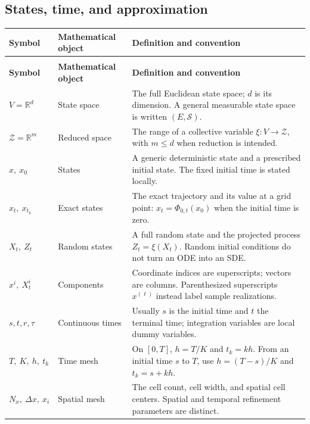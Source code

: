 \subsection*{States, time, and approximation}
\begingroup
\small
{}
\setlength{\tabcolsep}{4pt}
\renewcommand{\arraystretch}{1.16}
\begin{longtable}{@{}>{\raggedright\arraybackslash}p{32mm}>{\raggedright\arraybackslash}p{26mm}>{\raggedright\arraybackslash}p{90mm}@{}}
\toprule
\textbf{Symbol} & \textbf{Mathematical object} & \textbf{Definition and convention}\\
\midrule
\endfirsthead
\multicolumn{3}{@{}l}{\small\itshape States, time, and approximation (continued)}\\[3pt]
\toprule
\textbf{Symbol} & \textbf{Mathematical object} & \textbf{Definition and convention}\\
\midrule
\endhead
\bottomrule
\endfoot
$V=\mathbb R^d$ & State space & The full Euclidean state space; $d$ is its dimension. A general measurable state space is written $(E,\mathcal S)$.\\[3pt]
$\mathcal Z=\mathbb R^m$ & Reduced space & The range of a collective variable $\xi:V\to\mathcal Z$, with $m\le d$ when reduction is intended.\\[3pt]
$x,\ x_0$ & States & A generic deterministic state and a prescribed initial state. The fixed initial time is stated locally.\\[3pt]
$x_t,\ x_{t_k}$ & Exact states & The exact trajectory and its value at a grid point: $x_t=\Phi_{0,t}(x_0)$ when the initial time is zero.\\[3pt]
$X_t,\ Z_t$ & Random states & A full random state and the projected process $Z_t=\xi(X_t)$. Random initial conditions do not turn an ODE into an SDE.\\[3pt]
$x^i,\ X_t^i$ & Components & Coordinate indices are superscripts; vectors are columns. Parenthesized superscripts $x^{(\ell)}$ instead label sample realizations.\\[3pt]
$s,t,r,\tau$ & Continuous times & Usually $s$ is the initial time and $t$ the terminal time; integration variables are local dummy variables.\\[3pt]
$T,\ K,\ h,\ t_k$ & Time mesh & On $[0,T]$, $h=T/K$ and $t_k=kh$. From an initial time $s$ to $T$, use $h=(T-s)/K$ and $t_k=s+kh$.\\[3pt]
$N_x,\ \Delta x,\ x_i$ & Spatial mesh & The cell count, cell width, and spatial cell centers. Spatial and temporal refinement parameters are distinct.\\[3pt]

\end{longtable}

